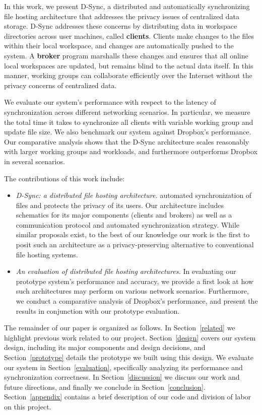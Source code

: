 In this work, we present D-Sync, a distributed and automatically synchronizing file hosting
architecture that addresses the privacy issues of centralized data storage.
D-Sync addresses these concerns
by distributing data in workspace directories across user machines, called \textbf{clients}.
Clients make changes to the files within their local workspace,
and changes are automatically pushed to the system.
A \textbf{broker} program marshalls these changes and ensures that all online local workspaces are updated,
but remains blind to the actual data itself.
In this manner, working groups can collaborate efficiently over the Internet
without the privacy concerns of centralized data.

We evaluate our system's performance with respect to the latency
of synchronization across different networking scenarios.
In particular, we measure the total time it takes to synchronize
all clients with variable working group and update file size.
We also benchmark our system against Dropbox's performance.
Our comparative analysis shows that the D-Sync architecture
scales reasonably with larger working groups and workloads,
and furthermore outperforms Dropbox in several scenarios.

The contributions of this work include:
\begin{itemize}
\item \emph{D-Sync: a distributed file hosting architecture.} 
automated synchronization of files and protects the privacy of its users.
Our architecture includes schematics for its major components (clients and brokers) as well as a communication protocol and automated synchronization strategy.
While similar proposals exist, to the best of our knowledge 
our work is the first to posit such an architecture as a privacy-preserving alternative to conventional file hosting systems.
\item \emph{An evaluation of distributed file hosting architectures.}
In evaluating our prototype system's performance and accuracy,
we provide a first look at how such architectures may perform
on various network scenarios.
Furthermore, we conduct a comparative analysis of Dropbox's
performance, and present the results in conjunction with our prototype evaluation.
\end{itemize}

The remainder of our paper is organized as follows.
In Section~\ref{related} we highlight previous work related to our project.
Section~\ref{design} covers our system design, including
its major components and design decisions,
and Section~\ref{prototype} details the prototype we built using this design.
We evaluate our system in Section~\ref{evaluation}, specifically
analyzing its performance and synchronization correctness.
In Section~\ref{discussion} we discuss our work and future directions,
and finally we conclude in Section~\ref{conclusion}.
Section~\ref{appendix} contains a brief description
of our code and division of labor on this project.

